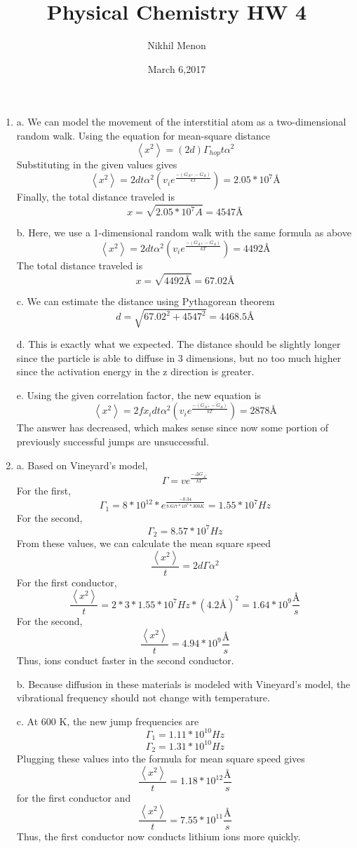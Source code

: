 \documentclass{article}
\title{Physical Chemistry HW 4}
\author{Nikhil Menon}
\date{March 6,2017}
\newcommand{\ang}{\mbox{\AA}}
\begin{document}
\maketitle
\begin{enumerate}
\item

a. We can model the movement of the interstitial atom as a two-dimensional random walk. Using the equation for mean-square distance
$$\left<x^2\right>=(2d)\Gamma_{hop}t\alpha^2$$
Substituting in the given values gives
$$\left<x^2\right>=2dt\alpha^2(v_ie^{\frac{-(G_{A*}-G_{A})}{kT}})=2.05*10^7 \ang$$
Finally, the total distance traveled is
$$x=\sqrt{2.05*10^7 A} = 4547 \ang$$

b. Here, we use a 1-dimensional random walk with the same formula as above
$$\left<x^2\right>=2dt\alpha^2(v_ie^{\frac{-(G_{A*}-G_{A})}{kT}})=4492 \ang$$
The total distance traveled is
$$x=\sqrt{4492 \ang}=67.02 \ang$$

c. We can estimate the distance using Pythagorean theorem
$$d=\sqrt{67.02^2+4547^2}=4468.5 \ang$$

d. This is exactly what we expected. The distance should be slightly longer since the particle is able to diffuse in 3 dimensions, but no too much higher since the activation energy in the z direction is greater.

e. Using the given correlation factor, the new equation is
$$\left<x^2\right>=2fx_idt\alpha^2(v_ie^{\frac{-(G_{A*}-G_{A})}{kT}}) = 2878 \ang$$
The answer has decreased, which makes sense since now some portion of previously successful jumps are unsuccessful.

\item

a. Based on Vineyard's model,
$$\Gamma=ve^{\frac{-\Delta G_{A^*}}{kT}}$$
For the first,
$$\Gamma_1=8*10^12*e^{\frac{-0.34}{8.617*10^5*300 K}}=1.55*10^7 Hz$$
For the second,
$$\Gamma_2=8.57*10^7 Hz$$
From these values, we can calculate the mean square speed
$$\frac{\left<x^2\right>}{t}=2d\Gamma\alpha^2$$
For the first conductor,
$$\frac{\left<x^2\right>}{t}=2*3*1.55*10^7 Hz*(4.2 \ang)^2=1.64*10^9 \frac{\ang}{s}$$
For the second,
$$\frac{\left<x^2\right>}{t}=4.94*10^9 \frac{\ang}{s}$$
Thus, ions conduct faster in the second conductor.

b. Because diffusion in these materials is modeled with Vineyard's model, the vibrational frequency should not change with temperature.

c. At 600 K, the new jump frequencies are
$$\Gamma_1=1.11*10^{10} Hz$$
$$\Gamma_2=1.31*10^{10} Hz$$
Plugging these values into the formula for mean square speed gives
$$\frac{\left<x^2\right>}{t}=1.18*10^{12}  \frac{\ang}{s}$$
for the first conductor and
$$\frac{\left<x^2\right>}{t}=7.55*10^{11}  \frac{\ang}{s}$$
Thus, the first conductor now conducts lithium ions more quickly.


\end{enumerate}
\end{document}
